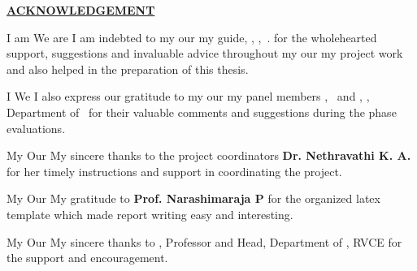 \thispagestyle{empty}

\begin{center}
\Large\textbf{\underline{ACKNOWLEDGEMENT}} \par
\end{center}

\ifPG I am \else
\ifStuNameBUsed We are \else I am \fi\fi indebted to \ifPG my \else\ifStuNameBUsed our \else my \fi\fi guide, \textbf{\printGuideNameA}, \printGuideDesigA, \printGuideOrgA$\,.$ for the wholehearted support, suggestions and invaluable advice throughout \ifPG my \else\ifStuNameBUsed our \else my \fi\fi project work and also helped in the preparation of this thesis.\\ \par

\ifPG I \else \ifStuNameBUsed We \else I \fi\fi also express our gratitude to \ifPG my \else\ifStuNameBUsed our \else my \fi\fi  panel members \textbf{\printPanelMemberA}, \printPanelMemberDesigA $\,$ and \textbf{\printPanelMemberB}, \printPanelMemberDesigB , Department of \printDepartmentLF\, for their valuable comments and suggestions during the phase evaluations. \\ \par

\ifPG My \else \ifStuNameBUsed Our \else My \fi\fi sincere thanks to the project coordinators \textbf{Dr. Nethravathi K. A.} for her timely instructions and support in coordinating the project.\\ \par

\ifPG My \else \ifStuNameBUsed Our \else My \fi\fi gratitude to \textbf{Prof. Narashimaraja P} for the organized latex template which made report writing easy and interesting.\\ \par


\ifPG My \else \ifStuNameBUsed Our \else My \fi\fi sincere thanks to \textbf{\printHOD}, Professor and Head, Department of \printDepartmentLF, RVCE for the support and encouragement.\\ \par


